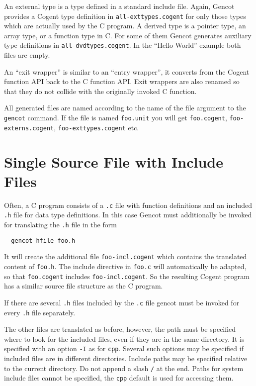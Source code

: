 \documentclass[a4paper]{report}
\newcommand{\code}[1]{\textnormal{\texttt{#1}}}
\begin{document}
An external type is a type defined in a standard include file. Again, Gencot provides a Cogent type definition in 
\code{all-exttypes.cogent} for only those 
types which are actually used by the C program. A derived type is a pointer type, an array type, or a function type in C. For 
some of them Gencot generates auxiliary type definitions in \code{all-dvdtypes.cogent}. In the ``Hello World'' example 
both files are empty.

An ``exit wrapper'' is similar to an ``entry wrapper'', it converts from the Cogent function API back to the C function API.
Exit wrappers are also renamed so that they do not collide with the originally invoked C function.

All generated files are named according to the name of the file argument to the \code{gencot} command. If the file is named 
\code{foo.unit} you will get \code{foo.cogent}, \code{foo-externs.cogent}, \code{foo-exttypes.cogent} etc.

\section{Single Source File with Include Files}
\label{struct-include}

Often, a C program consists of a \code{.c} file with function definitions and an included \code{.h} file for data type 
definitions. In this case Gencot must additionally be invoked for translating the \code{.h} file in the form
\begin{verbatim}
  gencot hfile foo.h
\end{verbatim}
It will create the additional file \code{foo-incl.cogent} which contains the translated content of \code{foo.h}. The 
include directive in \code{foo.c} will automatically be adapted, so that \code{foo.cogent} includes \code{foo-incl.cogent}.
So the resulting Cogent program has a similar source file structure as the C program.

If there are several \code{.h} files included by the \code{.c} file gencot must be invoked for every \code{.h} file
separately.

The other files are translated as before, however, the path must be specified where to look for the included files, even
if they are in the same directory. It is specified with an option \code{-I} as for \code{cpp}. Several such options may 
be specified if included files are in different directories. Include paths may be specified relative to the current 
directory. Do not append a slash \code{/} at the end. Paths for system include files cannot be specified, the \code{cpp} 
default is used for accessing them.
\end{document}
